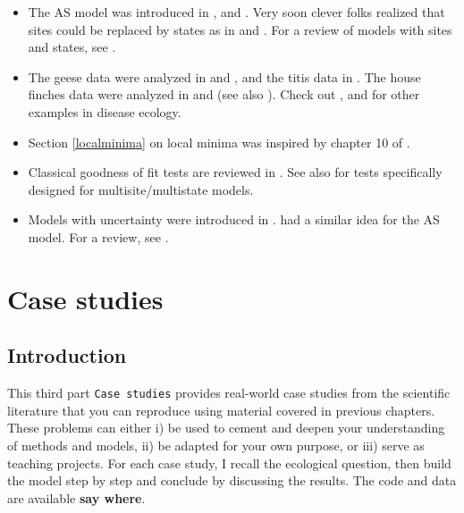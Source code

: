 \documentclass[
  12pt,
]{krantz}
\begin{document}
\begin{itemize}
\item
  The AS model was introduced in \citet{arnason1972}, \citet{arnason1973} and \citet{SchwarzEtAl1993}. Very soon clever folks realized that sites could be replaced by states as in \citet{NicholsEtAl1992} and \citet{NicholsEtAl1994}. For a review of models with sites and states, see \citet{LebretonEtAl2009}.
\item
  The geese data were analyzed in \citet{hestbeck1991estimates} and \citet{BrownieEtAl1993}, and the titis data in \citet{scofield2001titi}. The house finches data were analyzed in \citet{FaustinoEtAl2004} and \citet{ConnCooch2009} (see also \citet{cooch2012disease}). Check out \citet{santoro2014host}, \citet{MarescotEtAl2018} and \citet{ollivier2023lyme} for other examples in disease ecology.
\item
  Section \ref{localminima} on local minima was inspired by chapter 10 of \citet{cooch2017intromark}.
\item
  Classical goodness of fit tests are reviewed in \citet{pradel2005gof}. See also \citet{pradel2003gof} for tests specifically designed for multisite/multistate models.
\item
  Models with uncertainty were introduced in \citet{pradel_multievent_2005}. \citet{dupuis_bayesian_1995} had a similar idea for the AS model. For a review, see \citet{gimenez_estimating_2012}.
\end{itemize}

\part{Case studies}\label{part-case-studies}

\chapter*{Introduction}\label{introduction-7}


This third part \texttt{Case\ studies} provides real-world case studies from the scientific literature that you can reproduce using material covered in previous chapters. These problems can either i) be used to cement and deepen your understanding of methods and models, ii) be adapted for your own purpose, or iii) serve as teaching projects. For each case study, I recall the ecological question, then build the model step by step and conclude by discussing the results. The code and data are available \textbf{say where}.
\end{document}

